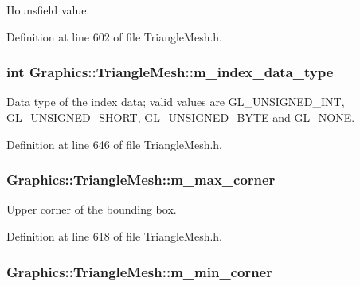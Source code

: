 Hounsfield value. 



Definition at line 602 of file TriangleMesh.h.

\hypertarget{class_graphics_1_1_triangle_mesh_a2c16366d7cb7dd6aaff54d96e1bf0eaf}{
\subsubsection[{m\_\-index\_\-data\_\-type}]{\setlength{\rightskip}{0pt plus 5cm}int {\bf Graphics::TriangleMesh::m\_\-index\_\-data\_\-type}}}
\label{class_graphics_1_1_triangle_mesh_a2c16366d7cb7dd6aaff54d96e1bf0eaf}


Data type of the index data; valid values are GL\_\-UNSIGNED\_\-INT, GL\_\-UNSIGNED\_\-SHORT, GL\_\-UNSIGNED\_\-BYTE and GL\_\-NONE. 



Definition at line 646 of file TriangleMesh.h.

\hypertarget{class_graphics_1_1_triangle_mesh_a7b30119057f7194dc47925bcd4489e0a}{
\subsubsection[{m\_\-max\_\-corner}]{ {\bf Graphics::TriangleMesh::m\_\-max\_\-corner}}}
\label{class_graphics_1_1_triangle_mesh_a7b30119057f7194dc47925bcd4489e0a}


Upper corner of the bounding box. 



Definition at line 618 of file TriangleMesh.h.

\hypertarget{class_graphics_1_1_triangle_mesh_a0ec9a88bde30813c632178b5cbb4c3e5}{
\subsubsection[{m\_\-min\_\-corner}]{ {\bf Graphics::TriangleMesh::m\_\-min\_\-corner}}}
\label{class_graphics_1_1_triangle_mesh_a0ec9a88bde30813c632178b5cbb4c3e5}


